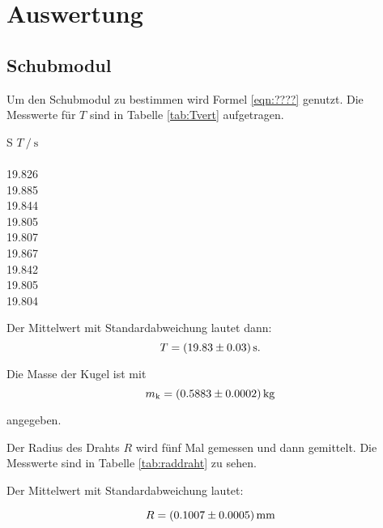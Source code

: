 \section{Auswertung}
\label{sec:Auswertung}

\subsection{Schubmodul}

Um den Schubmodul zu bestimmen wird Formel \eqref{eqn:????} genutzt.                  %
Die Messwerte für $T$ sind in Tabelle \ref{tab:Tvert} aufgetragen.

\begin{table}[h]
  \centering
  \caption{Messwerte der Periodendauern bei vertikalem Magnet in der Kugel.}
  \label{tab:Tvert}
  \begin{tabular}{S}
    \toprule
    {$T\:/\:\si{\second}$} \\
     \\
    19.826 \\
    19.885 \\
    19.844 \\
    19.805 \\
    19.807 \\
    19.867 \\
    19.842 \\
    19.805 \\
    19.804 \\
    \bottomrule
  \end{tabular}
\end{table}

Der Mittelwert mit Standardabweichung lautet dann:
\begin{equation*}
  T = \SI{19.83 +- 0.03}{\second}.
\end{equation*}

Die Masse der Kugel ist mit
\begin{equation*}
  m_{\text{k}}= \SI{0.5883 +- 0.0002}{\kilogram}
\end{equation*}

angegeben.

Der Radius des Drahts $R$ wird fünf Mal gemessen und dann gemittelt.
Die Messwerte sind in Tabelle \ref{tab:raddraht} zu sehen.

Der Mittelwert mit Standardabweichung lautet:

\begin{equation*}
  R = \SI{0.1007 +- 0.0005}{\milli\meter}
\end{equation*}

